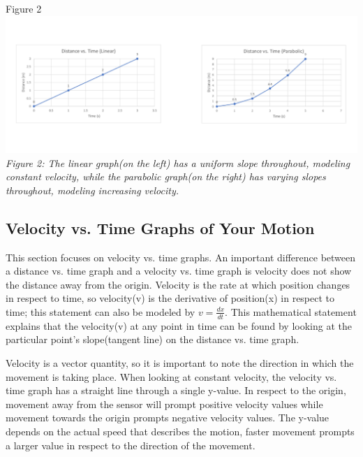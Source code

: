 \documentclass[aps,letterpaper,11pt]{revtex4}
\begin{document}
\begin{center}
Figure 2\\
\includegraphics[width=7in]{LinearandParabolic1.pdf}\\
\textit{Figure 2: The linear graph(on the left) has a uniform slope throughout, modeling constant velocity, while the parabolic graph(on the right) has varying slopes throughout, modeling increasing velocity.}
\end{center}

\subsection{Velocity vs. Time Graphs of Your Motion}

This section focuses on velocity vs. time graphs. An important difference between a distance vs. time graph and a velocity vs. time graph is velocity does not show the distance away from the origin.  Velocity is the rate at which position changes in respect to time, so velocity(v) is the derivative of position(x) in respect to time; this statement can also be modeled by $v = \frac{dx}{dt}$. This mathematical statement explains that the velocity(v) at any point in time can be found by looking at the particular point's slope(tangent line) on the distance vs. time graph. 

Velocity is a vector quantity, so it is important to note the direction in which the movement is taking place. When looking at constant velocity, the velocity vs. time graph has a straight line through a single y-value. In respect to the origin, movement away from the sensor will prompt positive velocity values while movement towards the origin prompts negative velocity values. The y-value depends on the actual speed that describes the motion, faster movement prompts a larger value in respect to the direction of the movement. 
\end{document}
